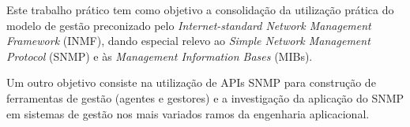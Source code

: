 \documentclass[../momento_1.tex]{subfiles}
\begin{document}
Este trabalho prático tem como objetivo a consolidação da utilização prática do modelo de gestão preconizado pelo \textit{Internet-standard Network Management Framework} (INMF), dando especial relevo ao \textit{Simple Network Management Protocol} (SNMP) e às \textit{Management Information Bases} (MIBs).\par
Um outro objetivo consiste na utilização de APIs SNMP para construção de ferramentas de gestão (agentes e gestores) e a investigação da aplicação do SNMP em sistemas de gestão nos mais variados ramos da engenharia aplicacional.
\end{document}
